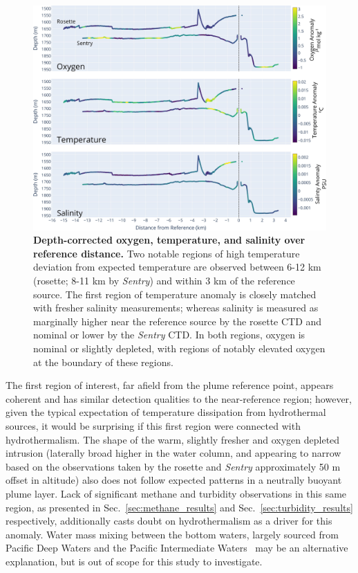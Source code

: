 \begin{figure}[h!]
    \centering
    \includegraphics[width=1\columnwidth]{figures/chap3_o2_temp_salt_over_distance.jpg}
    \caption[Depth-corrected oxygen, temperature, and salinity measurements collected during transect]{\textbf{Depth-corrected oxygen, temperature, and salinity over reference distance.} Two notable regions of high temperature deviation from expected temperature are observed between 6-12 km (rosette; 8-11 km by \emph{Sentry}) and within 3 km of the reference source. The first region of temperature anomaly is closely matched with fresher salinity measurements; whereas salinity is measured as marginally higher near the reference source by the rosette CTD and nominal or lower by the \emph{Sentry} CTD. In both regions, oxygen is nominal or slightly depleted, with regions of notably elevated oxygen at the boundary of these regions.}
    \label{fig:o2_temp_salt}
\end{figure}

The first region of interest, far afield from the plume reference point, appears coherent and has similar detection qualities to the near-reference region; however, given the typical expectation of temperature dissipation from hydrothermal sources, it would be surprising if this first region were connected with hydrothermalism. The shape of the warm, slightly fresher and oxygen depleted intrusion (laterally broad higher in the water column, and appearing to narrow based on the observations taken by the rosette and \emph{Sentry} approximately 50 m offset in altitude) also does not follow expected patterns in a neutrally buoyant plume layer. Lack of significant methane and turbidity observations in this same region, as presented in Sec.~\ref{sec:methane_results} and Sec.~\ref{sec:turbidity_results} respectively, additionally casts doubt on hydrothermalism as a driver for this anomaly. Water mass mixing between the bottom waters, largely sourced from Pacific Deep Waters and the Pacific Intermediate Waters~\autocite{bray1988water} may be an alternative explanation, but is out of scope for this study to investigate. 


